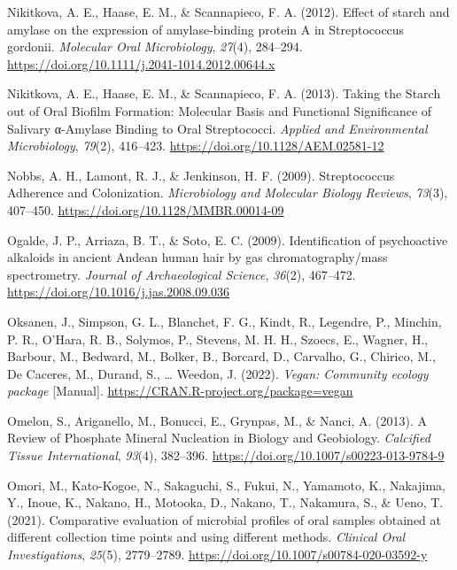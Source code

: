 \documentclass[
  letterpaper,
]{book}
\newlength{\cslhangindent}
\newlength{\cslentryspacingunit} %
\newenvironment{CSLReferences}[2] %
 {%
  \setlength{\parindent}{0pt}
  \ifodd #1
  \let\oldpar\par
  \def\par{\hangindent=\cslhangindent\oldpar}
  \fi
  \setlength{\parskip}{#2\cslentryspacingunit}
 }%
 {}
\begin{document}
\begin{CSLReferences}{1}{0}
\leavevmode{}%
Nikitkova, A. E., Haase, E. M., \& Scannapieco, F. A. (2012). Effect of
starch and amylase on the expression of amylase-binding protein {A} in
{Streptococcus} gordonii. \emph{Molecular Oral Microbiology},
\emph{27}(4), 284--294.
\url{https://doi.org/10.1111/j.2041-1014.2012.00644.x}

\leavevmode{}%
Nikitkova, A. E., Haase, E. M., \& Scannapieco, F. A. (2013). Taking the
{Starch} out of {Oral Biofilm Formation}: {Molecular Basis} and
{Functional Significance} of {Salivary} α-{Amylase Binding} to {Oral
Streptococci}. \emph{Applied and Environmental Microbiology},
\emph{79}(2), 416--423. \url{https://doi.org/10.1128/AEM.02581-12}

\leavevmode{}%
Nobbs, A. H., Lamont, R. J., \& Jenkinson, H. F. (2009). Streptococcus
{Adherence} and {Colonization}. \emph{Microbiology and Molecular Biology
Reviews}, \emph{73}(3), 407--450.
\url{https://doi.org/10.1128/MMBR.00014-09}

\leavevmode{}%
Ogalde, J. P., Arriaza, B. T., \& Soto, E. C. (2009). Identification of
psychoactive alkaloids in ancient {Andean} human hair by gas
chromatography/mass spectrometry. \emph{Journal of Archaeological
Science}, \emph{36}(2), 467--472.
\url{https://doi.org/10.1016/j.jas.2008.09.036}

\leavevmode{}%
Oksanen, J., Simpson, G. L., Blanchet, F. G., Kindt, R., Legendre, P.,
Minchin, P. R., O'Hara, R. B., Solymos, P., Stevens, M. H. H., Szoecs,
E., Wagner, H., Barbour, M., Bedward, M., Bolker, B., Borcard, D.,
Carvalho, G., Chirico, M., De Caceres, M., Durand, S., \ldots{} Weedon,
J. (2022). \emph{Vegan: {Community} ecology package} {[}Manual{]}.
\url{https://CRAN.R-project.org/package=vegan}

\leavevmode{}%
Omelon, S., Ariganello, M., Bonucci, E., Grynpas, M., \& Nanci, A.
(2013). A {Review} of {Phosphate Mineral Nucleation} in {Biology} and
{Geobiology}. \emph{Calcified Tissue International}, \emph{93}(4),
382--396. \url{https://doi.org/10.1007/s00223-013-9784-9}

\leavevmode{}%
Omori, M., Kato-Kogoe, N., Sakaguchi, S., Fukui, N., Yamamoto, K.,
Nakajima, Y., Inoue, K., Nakano, H., Motooka, D., Nakano, T., Nakamura,
S., \& Ueno, T. (2021). Comparative evaluation of microbial profiles of
oral samples obtained at different collection time points and using
different methods. \emph{Clinical Oral Investigations}, \emph{25}(5),
2779--2789. \url{https://doi.org/10.1007/s00784-020-03592-y}


\end{CSLReferences}
\end{document}
